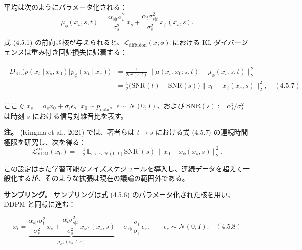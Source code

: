 平均は次のようにパラメータ化される：
\[
\mu_\phi(x_s,s,t)
=\frac{\alpha_{s|t}\sigma_t^2}{\sigma_s^2}\, x_s
+ \frac{\alpha_t\sigma_{s|t}^2}{\sigma_s^2}\, x_\phi(x_s,s).
\]


式 (4.5.1) の前向き核が与えられると、$\mathcal{L}_{\mathrm{diffusion}}(x;\phi)$ における KL ダイバージェンスは重み付き回帰損失に帰着する：

\begin{align*}
\begin{aligned}
D_{\mathrm{KL}}\bigl(p(x_t\mid x_s,x_0)\Vert p_\phi(x_t\mid x_s)\bigr)
&= \frac{1}{2\sigma^2(s,t)}\bigl\|\mu(x_s,x_0;s,t)-\mu_\phi(x_s,s,t)\bigr\|_2^2 \\
&= \tfrac12\bigl(\mathrm{SNR}(t)-\mathrm{SNR}(s)\bigr)\bigl\|x_0-x_\phi(x_s,s)\bigr\|_2^2, \quad (4.5.7)
\end{aligned}
\end{align*}


ここで $x_s=\alpha_s x_0+\sigma_s\epsilon$、$x_0\sim p_{\mathrm{data}}$、$\epsilon\sim\mathcal{N}(0,I)$、および $\mathrm{SNR}(s):=\alpha_s^2/\sigma_s^2$ は時刻 $s$ における信号対雑音比を表す。

\textbf{注。}
(Kingma et al., 2021) では、著者らは $t\to s$ における式 (4.5.7) の連続時間極限を研究し、次を得る：
\[
\mathcal{L}_{\mathrm{VDM}}^{\infty}(x_0)
= -\tfrac12\,\mathbb{E}_{s,\epsilon\sim\mathcal{N}(0,I)}\mathrm{SNR}'(s)\,\|x_0-x_\phi(x_s,s)\|_2^2.
\]

この設定はまた学習可能なノイズスケジュールを導入し、連続データを超えて一般化するが、そのような拡張は現在の議論の範囲外である。

\textbf{サンプリング。} サンプリングは式 (4.5.6) のパラメータ化された核を用い、DDPM と同様に進む：

\[
x_t
= \underbrace{
\frac{\alpha_{s|t}\sigma_t^2}{\sigma_s^2}\, x_s
+ \frac{\alpha_t\sigma_{s|t}^2}{\sigma_s^2}\, x_{\phi^\times}(x_s,s)
}_{\mu_{\phi^\times}(x_s,t,s)}
+ \sigma_{s|t}\frac{\sigma_t}{\sigma_s}\,\epsilon_s,
\qquad \epsilon_s\sim\mathcal{N}(0,I). \quad (4.5.8)
\]



